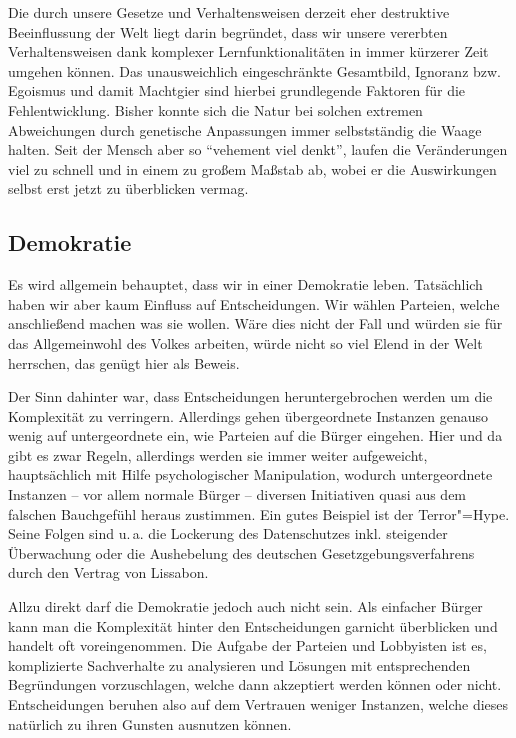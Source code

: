 Die durch unsere Gesetze und Verhaltensweisen derzeit eher destruktive Beeinflussung der Welt liegt darin begründet, dass wir unsere vererbten Verhaltensweisen dank komplexer Lernfunktionalitäten in immer kürzerer Zeit umgehen können. Das unausweichlich eingeschränkte Gesamtbild, Ignoranz bzw. Egoismus und damit Machtgier sind hierbei grundlegende Faktoren für die Fehlentwicklung. Bisher konnte sich die Natur bei solchen extremen Abweichungen durch genetische Anpassungen immer selbstständig die Waage halten. Seit der Mensch aber so "`vehement viel denkt"', laufen die Veränderungen viel zu schnell und in einem zu großem Maßstab ab, wobei er die Auswirkungen selbst erst jetzt zu überblicken vermag.

\subsection{Demokratie}\label{sec:situation/democracy}

Es wird allgemein behauptet, dass wir in einer Demokratie leben. Tatsächlich haben wir aber kaum Einfluss auf Entscheidungen. Wir wählen Parteien, welche anschließend machen was sie wollen. Wäre dies nicht der Fall und würden sie für das Allgemeinwohl des Volkes arbeiten, würde nicht so viel Elend in der Welt herrschen, das genügt hier als Beweis.

Der Sinn dahinter war, dass Entscheidungen heruntergebrochen werden um die Komplexität zu verringern. Allerdings gehen übergeordnete Instanzen genauso wenig auf untergeordnete ein, wie Parteien auf die Bürger eingehen. Hier und da gibt es zwar Regeln, allerdings werden sie immer weiter aufgeweicht, hauptsächlich mit Hilfe psychologischer Manipulation, wodurch untergeordnete Instanzen -- vor allem normale Bürger -- diversen Initiativen quasi aus dem falschen Bauchgefühl heraus zustimmen. Ein gutes Beispiel ist der Terror"=Hype. Seine Folgen sind u.\,a. die Lockerung des Datenschutzes inkl. steigender Überwachung oder die Aushebelung des deutschen Gesetzgebungsverfahrens durch den Vertrag von Lissabon.

Allzu direkt darf die Demokratie jedoch auch nicht sein. Als einfacher Bürger kann man die Komplexität hinter den Entscheidungen garnicht überblicken und handelt oft voreingenommen. Die Aufgabe der Parteien und Lobbyisten ist es, komplizierte Sachverhalte zu analysieren und Lösungen mit entsprechenden Begründungen vorzuschlagen, welche dann akzeptiert werden können oder nicht. Entscheidungen beruhen also auf dem Vertrauen weniger Instanzen, welche dieses natürlich zu ihren Gunsten ausnutzen können.

